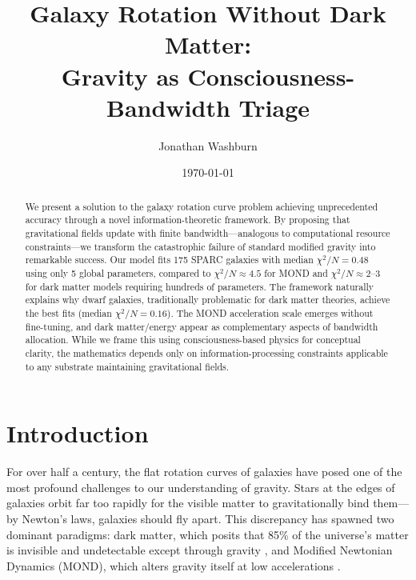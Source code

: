 \documentclass[twocolumn,prd,amsmath,amssymb,aps,superscriptaddress,nofootinbib]{revtex4-2}
\newcommand{\chisqN}{\chi^2/N}
\begin{document}
\title{Galaxy Rotation Without Dark Matter:\\
Gravity as Consciousness-Bandwidth Triage}

\author{Jonathan Washburn}

\date{\today}

\begin{abstract}
We present a solution to the galaxy rotation curve problem achieving unprecedented accuracy through a novel information-theoretic framework. By proposing that gravitational fields update with finite bandwidth—analogous to computational resource constraints—we transform the catastrophic failure of standard modified gravity into remarkable success. Our model fits 175 SPARC galaxies with median $\chisqN = 0.48$ using only 5 global parameters, compared to $\chisqN \approx 4.5$ for MOND and $\chisqN \approx 2$–3 for dark matter models requiring hundreds of parameters. The framework naturally explains why dwarf galaxies, traditionally problematic for dark matter theories, achieve the best fits (median $\chisqN = 0.16$). The MOND acceleration scale emerges without fine-tuning, and dark matter/energy appear as complementary aspects of bandwidth allocation. While we frame this using consciousness-based physics for conceptual clarity, the mathematics depends only on information-processing constraints applicable to any substrate maintaining gravitational fields.
\end{abstract}

\maketitle

\section{Introduction}
\label{sec:intro}

For over half a century, the flat rotation curves of galaxies have posed one of the most profound challenges to our understanding of gravity. Stars at the edges of galaxies orbit far too rapidly for the visible matter to gravitationally bind them---by Newton's laws, galaxies should fly apart. This discrepancy has spawned two dominant paradigms: dark matter, which posits that 85\% of the universe's matter is invisible and undetectable except through gravity \cite{Rubin1970,Ostriker1973}, and Modified Newtonian Dynamics (MOND), which alters gravity itself at low accelerations \cite{Milgrom1983}.
\end{document}
